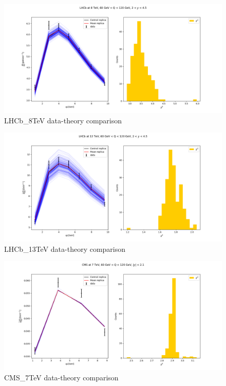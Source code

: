 \documentclass[
]{article}
\begin{document}
\begin{figure}
\centering
\includegraphics{pngplots/LHCb_8TeV.png}
\caption{LHCb\_8TeV data-theory comparison}
\end{figure}

\begin{figure}
\centering
\includegraphics{pngplots/LHCb_13TeV.png}
\caption{LHCb\_13TeV data-theory comparison}
\end{figure}

\begin{figure}
\centering
\includegraphics{pngplots/CMS_7TeV.png}
\caption{CMS\_7TeV data-theory comparison}
\end{figure}
\end{document}
